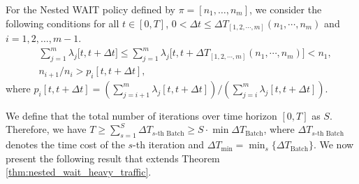 \documentclass[preprint]{article}
\theoremstyle{plain}
\theoremstyle{definition}
\theoremstyle{remark}
\begin{document}
For the Nested WAIT policy defined by $\pi = [n_1, \dots, n_m]$, we consider the following conditions for all $t\in [0, T]$, $0<\Delta t\leq \Delta T_{[1,2,\cdots,m]}(n_1,\cdots,n_m)$ and $i = 1, 2, \dots, m-1$.
\begin{equation}
\label{eq:nested_wait_thresholds_time_varying}
\begin{aligned}
        & \sum_{j=1}^m \lambda_j\big[t, t + \Delta t\big] \leq \sum_{j=1}^m \lambda_j\big[t, t +\Delta T_{[1,2,\cdots,m]}(n_1,\cdots,n_m)\big]< n_1, \\
        & n_{i+1}/n_i > p_i[t,t+\Delta t],
\end{aligned}
\end{equation}
where $p_i[t,t+\Delta t] = (\sum_{j=i+1}^m\lambda_j[t,t+\Delta t])/(\sum_{j=i}^m\lambda_j[t,t+\Delta t]).$

 We define that the total number of iterations over time horizon $[0,T]$ as $ S$. Therefore, we have $T\ge\sum_{s=1}^S \Delta T_{s\text{-th Batch}}\geq S\cdot \min \Delta T_{\text{Batch}}$, where $ \Delta T_{s\text{-th Batch}}$ denotes the time cost of the $s$-th iteration and $\Delta T_{\min}=\min_s\{\Delta T_{\text{Batch}}\}$.
We now present the following result that extends Theorem \ref{thm:nested_wait_heavy_traffic}.
\end{document}

